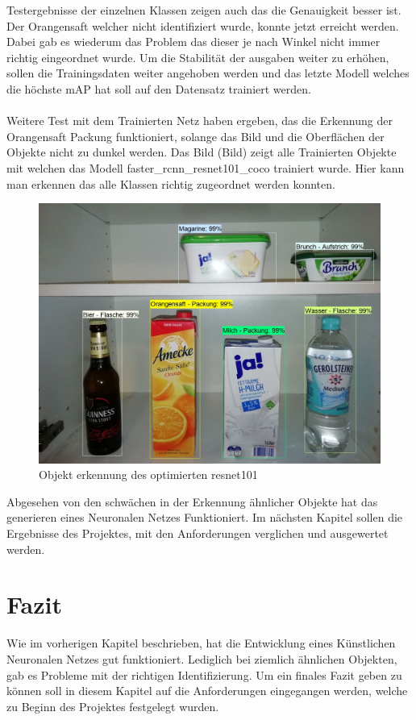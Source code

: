 \documentclass[a4paper,12pt,oneside]{article}
\begin{document}
Testergebnisse der einzelnen Klassen zeigen auch das die Genauigkeit besser ist. Der Orangensaft welcher nicht identifiziert wurde, konnte jetzt erreicht werden. Dabei gab es wiederum das Problem das dieser je nach Winkel nicht immer richtig eingeordnet wurde. Um die Stabilität der ausgaben weiter zu erhöhen, sollen die Trainingsdaten weiter angehoben werden und das letzte Modell welches die höchste mAP hat soll auf den Datensatz trainiert werden.\\
\\
Weitere Test mit dem Trainierten Netz haben ergeben, das die Erkennung der Orangensaft Packung funktioniert, solange das Bild und die Oberflächen der Objekte nicht zu dunkel werden. Das Bild (Bild) zeigt alle Trainierten Objekte mit welchen das Modell faster\_rcnn\_resnet101\_coco trainiert wurde. Hier kann man erkennen das alle Klassen richtig zugeordnet werden konnten.

\begin{figure}
    [h]
	\centering
	\includegraphics[scale=0.5]{Sources/final_detection.jpg}
	\vspace{0.3 cm}
	\caption{Objekt erkennung des optimierten resnet101}
	\label{img:loss_graph_resnet101}
\end{figure}

Abgesehen von den schwächen in der Erkennung ähnlicher Objekte hat das generieren eines Neuronalen Netzes Funktioniert. Im nächsten Kapitel sollen die Ergebnisse des Projektes, mit den Anforderungen verglichen und ausgewertet werden.

\newpage

\section{Fazit}
Wie im vorherigen Kapitel beschrieben, hat die Entwicklung eines Künstlichen Neuronalen Netzes gut funktioniert. Lediglich bei ziemlich ähnlichen Objekten, gab es Probleme mit der richtigen Identifizierung. Um ein finales Fazit geben zu können soll in diesem Kapitel auf die Anforderungen eingegangen werden, welche zu Beginn des Projektes festgelegt wurden.\\
\end{document}
